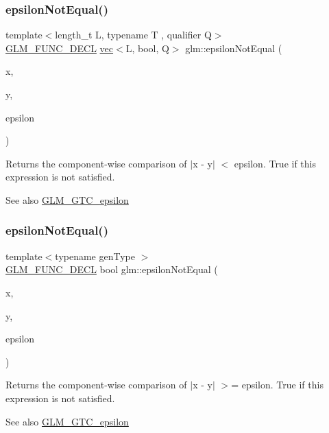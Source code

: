 \subsubsection{\texorpdfstring{epsilon\+Not\+Equal()}{epsilonNotEqual()}\hspace{0.1cm}{\footnotesize\ttfamily [1/2]}}
{\footnotesize\ttfamily template$<$length\+\_\+t L, typename T , qualifier Q$>$ \\
\mbox{\hyperlink{setup_8hpp_ab2d052de21a70539923e9bcbf6e83a51}{G\+L\+M\+\_\+\+F\+U\+N\+C\+\_\+\+D\+E\+CL}} \mbox{\hyperlink{structglm_1_1vec}{vec}}$<$L, bool, Q$>$ glm\+::epsilon\+Not\+Equal (\begin{DoxyParamCaption}\item[{\mbox{\hyperlink{structglm_1_1vec}{vec}}$<$ L, T, Q $>$ const \&}]{x,  }\item[{\mbox{\hyperlink{structglm_1_1vec}{vec}}$<$ L, T, Q $>$ const \&}]{y,  }\item[{T const \&}]{epsilon }\end{DoxyParamCaption})}

Returns the component-\/wise comparison of $\vert$x -\/ y$\vert$ $<$ epsilon. True if this expression is not satisfied.

\begin{DoxySeeAlso}{See also}
\mbox{\hyperlink{group__gtc__epsilon}{G\+L\+M\+\_\+\+G\+T\+C\+\_\+epsilon}} 
\end{DoxySeeAlso}
\mbox{\label{group__gtc__epsilon_ga50a92103fb0cbd796908e1bf20c79aaf}} 
\subsubsection{\texorpdfstring{epsilon\+Not\+Equal()}{epsilonNotEqual()}\hspace{0.1cm}{\footnotesize\ttfamily [2/2]}}
{\footnotesize\ttfamily template$<$typename gen\+Type $>$ \\
\mbox{\hyperlink{setup_8hpp_ab2d052de21a70539923e9bcbf6e83a51}{G\+L\+M\+\_\+\+F\+U\+N\+C\+\_\+\+D\+E\+CL}} bool glm\+::epsilon\+Not\+Equal (\begin{DoxyParamCaption}\item[{gen\+Type const \&}]{x,  }\item[{gen\+Type const \&}]{y,  }\item[{gen\+Type const \&}]{epsilon }\end{DoxyParamCaption})}

Returns the component-\/wise comparison of $\vert$x -\/ y$\vert$ $>$= epsilon. True if this expression is not satisfied.

\begin{DoxySeeAlso}{See also}
\mbox{\hyperlink{group__gtc__epsilon}{G\+L\+M\+\_\+\+G\+T\+C\+\_\+epsilon}} 
\end{DoxySeeAlso}
